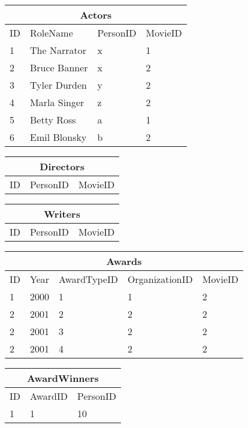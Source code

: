 \begin{center}
\begin{tabular}{|l|l|l|l|}
\hline
\multicolumn{4}{|c|}{Actors} \\ \hline
ID & RoleName & PersonID & MovieID \\ \hline
1 & The Narrator & x & 1 \\ \hline
2 & Bruce Banner & x & 2 \\ \hline
3 & Tyler Durden & y & 2 \\ \hline
4 & Marla Singer & z & 2 \\ \hline
5 & Betty Ross & a & 1 \\ \hline
6 & Emil Blonsky & b & 2 \\\hline 
\end{tabular}
\end{center}

\begin{center}
\begin{tabular}{|l|l|l|}
\hline
\multicolumn{3}{|c|}{Directors} \\ \hline
ID & PersonID & MovieID \\ \hline
\end{tabular}
\end{center}

\begin{center}
\begin{tabular}{|l|l|l|}
\hline
\multicolumn{3}{|c|}{Writers} \\ \hline
ID & PersonID & MovieID\\ \hline
\end{tabular}
\end{center}

\begin{center}
\begin{tabular}{|l|l|l|l|l|}
\hline
\multicolumn{5}{|c|}{Awards} \\ \hline
ID & Year & AwardTypeID & OrganizationID & MovieID \\ \hline \hline
1 & 2000 & 1 & 1 & 2 \\ \hline
2 & 2001 & 2 & 2 & 2 \\ \hline
2 & 2001 & 3 & 2 & 2 \\ \hline
2 & 2001 & 4 & 2 & 2 \\ \hline
\end{tabular}
\end{center}

\begin{center}
\begin{tabular}{|l|l|l|}
\hline
\multicolumn{3}{|c|}{AwardWinners} \\ \hline
ID & AwardID & PersonID \\ \hline \hline
1 & 1 & 10 \\ \hline
\end{tabular}
\end{center}

